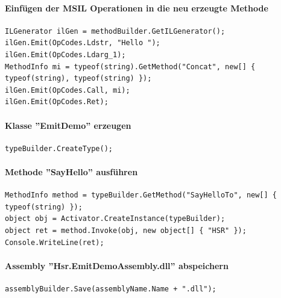 \documentclass[
a4paper,
oneside,
10pt,
fleqn,
headsepline,
toc=listofnumbered, 
bibliography=totocnumbered]{scrartcl}
\let\stdsection\section
\renewcommand\section{\clearpage\stdsection}
\begin{document}
\paragraph{Einfügen der MSIL Operationen in die neu erzeugte Methode}
\begin{lstlisting}
ILGenerator ilGen = methodBuilder.GetILGenerator();
ilGen.Emit(OpCodes.Ldstr, "Hello ");
ilGen.Emit(OpCodes.Ldarg_1);
MethodInfo mi = typeof(string).GetMethod("Concat", new[] { typeof(string), typeof(string) });
ilGen.Emit(OpCodes.Call, mi);
ilGen.Emit(OpCodes.Ret);
\end{lstlisting}

\paragraph{Klasse ''EmitDemo'' erzeugen}
\begin{lstlisting}
typeBuilder.CreateType();
\end{lstlisting}

\paragraph{Methode ''SayHello'' ausführen}
\begin{lstlisting}
MethodInfo method = typeBuilder.GetMethod("SayHelloTo", new[] { typeof(string) });
object obj = Activator.CreateInstance(typeBuilder);
object ret = method.Invoke(obj, new object[] { "HSR" });
Console.WriteLine(ret);
\end{lstlisting}

\paragraph{Assembly ''Hsr.EmitDemoAssembly.dll'' abspeichern}
\begin{lstlisting}
assemblyBuilder.Save(assemblyName.Name + ".dll");
\end{lstlisting}


\end{document}

